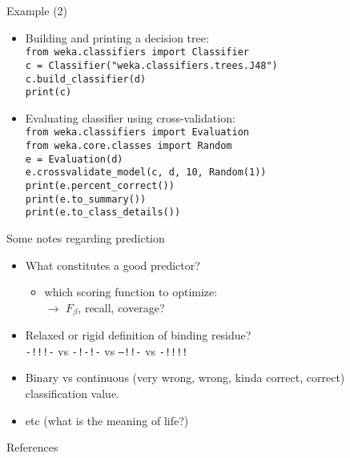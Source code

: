 \documentclass[pdf]
{beamer}
\begin{document}
\begin{frame}{Example (2)}
	\begin{itemize}
		\item Building and printing a decision tree:\\
			\texttt{from weka.classifiers import Classifier}\\
			\texttt{c = Classifier("weka.classifiers.trees.J48")}\\
			\texttt{c.build\_classifier(d)}\\
			\texttt{print(c)}
		\item Evaluating classifier using cross-validation:\\
			\texttt{from weka.classifiers import Evaluation}\\
			\texttt{from weka.core.classes import Random}\\
			\texttt{e = Evaluation(d)}\\
			\texttt{e.crossvalidate\_model(c, d, 10, Random(1))}\\
			\texttt{print(e.percent\_correct())}\\
			\texttt{print(e.to\_summary())}\\
			\texttt{print(e.to\_class\_details())}
	\end{itemize}
\end{frame}

\begin{frame}{Some notes regarding prediction}
	\begin{itemize}
		\item What constitutes a good predictor?\\
		\begin{itemize}
			\item which scoring function to optimize:\\
			$\rightarrow$ $F_{\beta}$, recall, coverage?
		\end{itemize}
		\item Relaxed or rigid definition of binding residue?\\
			\texttt{-!!!-} vs \texttt{-!-!-} vs \texttt{--!!-} vs \texttt{-!!!!}
		\item Binary vs continuous (very wrong, wrong, kinda correct, correct) classification value.
		\item etc (what is the meaning of life?)
	\end{itemize}
\end{frame}




\begin{frame}{References}

\end{frame}
\end{document}
